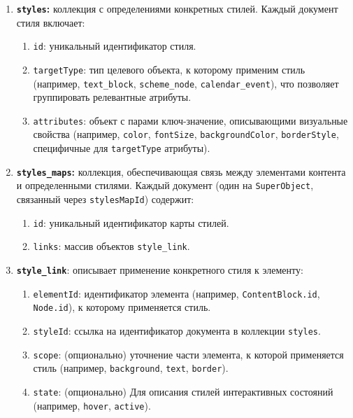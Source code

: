     \begin{enumerate}[wide=12.5mm, leftmargin=12.5mm]
        \item \textbf{\texttt{styles}:} коллекция с определениями конкретных стилей. Каждый документ стиля включает:
            \begin{enumerate}[wide=12.5mm, leftmargin=12.5mm]
                \item \texttt{id}: уникальный идентификатор стиля.
                \item \texttt{targetType}: тип целевого объекта, к которому применим стиль (например, \texttt{text\_block}, \texttt{scheme\_node}, \texttt{calendar\_event}), что позволяет группировать релевантные атрибуты.
                \item \texttt{attributes}: объект с парами ключ-значение, описывающими визуальные свойства (например, \texttt{color}, \texttt{fontSize}, \texttt{backgroundColor}, \texttt{borderStyle}, специфичные для \texttt{targetType} атрибуты).
            \end{enumerate}
        \item \textbf{\texttt{styles\_maps}:} коллекция, обеспечивающая связь между элементами контента и определенными стилями. Каждый документ (один на \texttt{SuperObject}, связанный через \texttt{stylesMapId}) содержит:
            \begin{enumerate}[wide=12.5mm, leftmargin=12.5mm]
                \item \texttt{id}: уникальный идентификатор карты стилей.
                \item \texttt{links}: массив объектов \texttt{style\_link}.
            \end{enumerate}
        \item \textbf{\texttt{style\_link}}: описывает применение конкретного стиля к элементу:
            \begin{enumerate}[wide=12.5mm, leftmargin=12.5mm]
                \item \texttt{elementId}: идентификатор элемента (например, \texttt{ContentBlock.id}, \texttt{Node.id}), к которому применяется стиль.
                \item \texttt{styleId}: ссылка на идентификатор документа в коллекции \texttt{styles}.
                \item \texttt{scope}: (опционально) уточнение части элемента, к которой применяется стиль (например, \texttt{background}, \texttt{text}, \texttt{border}).
                \item \texttt{state}: (опционально) Для описания стилей интерактивных состояний (например, \texttt{hover}, \texttt{active}).
            \end{enumerate}
    \end{enumerate}

